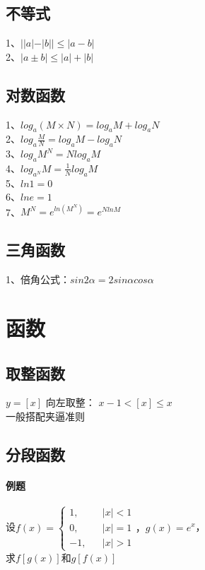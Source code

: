 \documentclass{article}
\begin{document}
\begin{flushleft}
	\subsection{不等式}
	1、$||a|-|b||\le |a-b|$\\
	2、$|a\pm b|\le |a|+|b|$\\
	
	\subsection{对数函数}
	1、$log_a(M\times N)=log_aM+log_aN$\\
	2、$log_a\frac{M}{N}=log_aM-log_aN$\\
	3、$log_aM^N=Nlog_aM$\\
	4、$log_{a^N}M=\frac{1}{N}log_aM$\\
	5、$ln1=0$\\
	6、$lne=1$\\
	7、$M^N=e^{ln(M^N)}=e^{NlnM}$\\
	
	\subsection{三角函数}
	1、倍角公式：$sin2α=2sinαcosα$\\
	
	
	
	\section{函数}
	
	\subsection{取整函数}
	$y=[x]$ 向左取整： $x-1<[x]\leq x$\\
	一般搭配夹逼准则\\
	
	\subsection{分段函数}
	
	\paragraph{例题}
	设$f(x)=\left\{
	\begin{array}{rcl}
		1,& & |x|<1\\
		0,& & |x|=1\\
		-1,& & |x|>1
	\end{array} \right.，g(x)=e^x$，\\
	求$f[g(x)]$和$g[f(x)]$

\end{flushleft}
\end{document}
